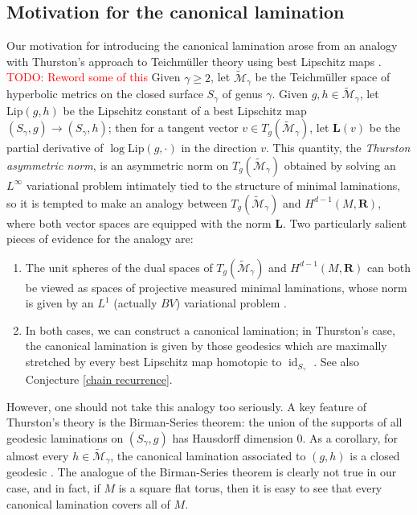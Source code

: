 \documentclass[reqno,11pt]{amsart}
\newcommand{\RR}{\mathbf{R}}
\DeclareMathOperator{\id}{id}
\newcommand{\Lip}{\mathrm{Lip}}
\newcommand{\Comass}{\mathbf L}
\newcommand{\dfn}[1]{\emph{#1}\index{#1}}
\theoremstyle{definition}
\numberwithin{equation}{section}
\newcommand\todo[1]{\textcolor{red}{TODO: #1}}
\begin{document}
\subsection{Motivation for the canonical lamination}\label{Teichmuller}
Our motivation for introducing the canonical lamination arose from an analogy with Thurston's approach to Teichm\"uller theory using best Lipschitz maps \cite{Thurston98}. \todo{Reword some of this}
Given $\gamma \geq 2$, let $\widetilde{\mathscr M}_\gamma$ be the Teichm\"uller space of hyperbolic metrics on the closed surface $S_\gamma$ of genus $\gamma$.
Given $g, h \in \widetilde{\mathscr M}_\gamma$, let $\Lip(g, h)$ be the Lipschitz constant of a best Lipschitz map $(S_\gamma, g) \to (S_\gamma, h)$; then for a tangent vector $v \in T_g(\widetilde{\mathscr M}_\gamma)$, let $\Comass(v)$ be the partial derivative of $\log \Lip(g, \cdot)$ in the direction $v$.
This quantity, the \dfn{Thurston asymmetric norm}, is an asymmetric norm on $T_g(\widetilde{\mathscr M}_\gamma)$ obtained by solving an $L^\infty$ variational problem intimately tied to the structure of minimal laminations, so it is tempted to make an analogy between $T_g(\widetilde{\mathscr M}_\gamma)$ and $H^{d - 1}(M, \RR)$, where both vector spaces are equipped with the norm $\Comass$.
Two particularly salient pieces of evidence for the analogy are:
\begin{enumerate}
\item The unit spheres of the dual spaces of $T_g(\widetilde{\mathscr M}_\gamma)$ and $H^{d - 1}(M, \RR)$ can both be viewed as spaces of projective measured minimal laminations, whose norm is given by an $L^1$ (actually $BV$) variational problem \cite[Theorem 5.1]{Thurston98}.
\item In both cases, we can construct a canonical lamination; in Thurston's case, the canonical lamination is given by those geodesics which are maximally stretched by every best Lipschitz map homotopic to $\id_{S_\gamma}$ \cite[\S8]{Thurston98}. See also Conjecture \ref{chain recurrence}.
\end{enumerate}
However, one should not take this analogy too seriously.
A key feature of Thurston's theory is the Birman-Series theorem: the union of the supports of all geodesic laminations on $(S_\gamma, g)$ has Hausdorff dimension $0$.
As a corollary, for almost every $h \in \widetilde{\mathscr M}_\gamma$, the canonical lamination associated to $(g, h)$ is a closed geodesic \cite[\S10]{Thurston98}.
The analogue of the Birman-Series theorem is clearly not true in our case, and in fact, if $M$ is a square flat torus, then it is easy to see that every canonical lamination covers all of $M$.
\end{document}
